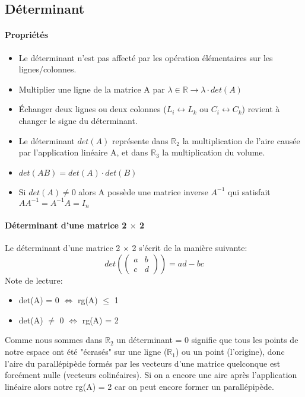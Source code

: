 \documentclass[10pt,a4paper]{book}
\newcommand{\R}{\mathbb{R}}
\newcommand{\x}{$\times$ }
\begin{document}
\subsection{Déterminant}

\paragraph{Propriétés}
\begin{itemize}
\item Le déterminant n'est pas affecté par les opération élémentaires sur les lignes/colonnes. 
\item Multiplier une ligne de la matrice A par $\lambda \in \R \rightarrow \lambda \cdot det(A)$ 
\item Échanger deux lignes ou deux colonnes (\(L_i \leftrightarrow L_k\) ou \(C_i \leftrightarrow C_k\)) revient à changer le signe du déterminant.
\item Le déterminant $det(A)$ représente dans $\R_2$ la multiplication de l'aire causée par l'application linéaire A, et dans $\R_3$ la multiplication du volume.
\item $det(AB) = det(A) \cdot det(B)$
\item Si $det(A) \neq 0$ alors A possède une matrice inverse $A^{-1}$ qui satisfait $AA^{-1} = A^{-1}A = I_n$ 
\end{itemize}

\paragraph{Déterminant d'une matrice 2 \x 2} Le déterminant d'une matrice 2 \x 2 s'écrit de la manière suivante: 
\[det\left(\begin{pmatrix}
a & b \\
c & d
\end{pmatrix}\right)
= ad - bc
\]
Note de lecture:
\begin{itemize}
\item det(A) = 0 $\Longleftrightarrow$ rg(A) $\leq$ 1 
\item det(A) $\neq$ 0 $\Longleftrightarrow$ rg(A) = 2 
\end{itemize}
Comme nous sommes dans $\R_2$ un déterminant = 0 signifie que tous les points de notre espace ont été "écrasés" sur une ligne ($\R_1$) ou un point (l'origine), donc l'aire du parallépipède formés par les vecteurs d'une matrice quelconque est forcément nulle (vecteurs colinéaires). Si on a encore une aire après l'application linéaire alors notre rg(A) = 2 car on peut encore former un parallépipède.
\end{document}

